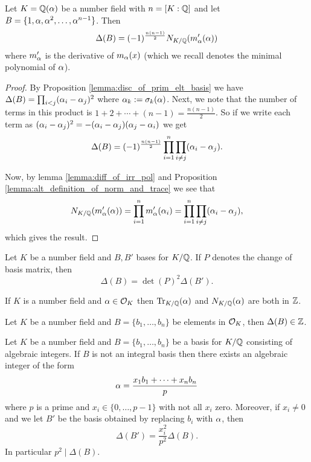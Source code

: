 \begin{lemma}\label{lemma:num_field_disc_in_terms_of_norm}
	Let $K=\mathbb{Q}(\alpha)$ be a number field with $n=[K:\mathbb{Q}]$ and let $B=\{1,\alpha,\alpha^2,\dots,\alpha^{n-1}\}$. Then \[\Delta(B)=(-1)^{\frac{n(n-1)}{2}}N_{K/\mathbb{Q}}(m_\alpha'(\alpha))\] where $m_\alpha'$ is the derivative of $m_\alpha(x)$ (which we recall denotes the minimal polynomial of $\alpha$).
\end{lemma}
\begin{proof}
	By Proposition \ref{lemma:disc_of_prim_elt_basis} we have $\Delta(B)=\prod_{i < j}(\alpha_i-\alpha_j)^2$ where $\alpha_k:=\sigma_k(\alpha)$. Next, we note that the number of terms in this product is $1+2+\cdots+(n-1)=\frac{n(n-1)}{2}$. So if we write each term as $(\alpha_i-\alpha_j)^2=-(\alpha_i-\alpha_j)(\alpha_j-\alpha_i)$ we get \[\Delta(B)=(-1)^{\frac{n(n-1)}{2}}\prod_{i=1}^n \prod_{i \neq j} (\alpha_i-\alpha_j). \]

	Now, by lemma \ref{lemma:diff_of_irr_pol} and Proposition \ref{lemma:alt_definition_of_norm_and_trace} we see that \[N_{K/\mathbb{Q}}(m_\alpha'(\alpha))=\prod_{i=1}^n m_\alpha'(\alpha_i)=\prod_{i=1}^n \prod_{i \neq j} (\alpha_i-\alpha_j),\] which gives the result.
\end{proof}

\begin{lemma}\label{lemma:disc_change_of_basis}
	Let $K$ be a number field and $B,B'$ bases for $K/\mathbb{Q}$. If $P$ denotes the change of basis matrix, then \[\Delta(B)=\det(P)^2 \Delta(B').\]
\end{lemma}

\begin{lemma}\label{lemma:norm_trace_of_alg_int_is_int}
	If $K$ is a number field and $\alpha \in \mathcal{O}_K$ then $\operatorname{Tr}_{K/\mathbb{Q}}(\alpha)$ and $N_{K/\mathbb{Q}}(\alpha)$ are both in $\mathbb{Z}$.
\end{lemma}

\begin{lemma}\label{lemma:int_basis_int_disc}
	Let $K$ be a number field and $B=\{b_1,\dots,b_n\}$ be elements in $\mathcal{O}_K$, then $\Delta(B) \in \mathbb{Z}$.
\end{lemma}

\begin{lemma}\label{lemma:disc_int_basis}
	Let $K$ be a number field and $B=\{b_1,\dots,b_n\}$ be a basis for $K/\mathbb{Q}$ consisting of algebraic integers. If $B$ is not an integral basis then there exists an algebraic integer of the form \[\alpha=\frac{x_1b_1+\cdots+x_nb_n}{p}\] where $p$ is a prime and $x_i \in \{0,\dots,p-1\}$ with not all $x_i$ zero. Moreover, if $x_i \neq 0$ and we let $B'$ be the basis obtained by replacing $b_i$ with $\alpha$, then \[\Delta(B')= \frac{x_i^2}{p^2} \Delta(B).\] In particular $p^2 \mid \Delta(B)$.
\end{lemma}

